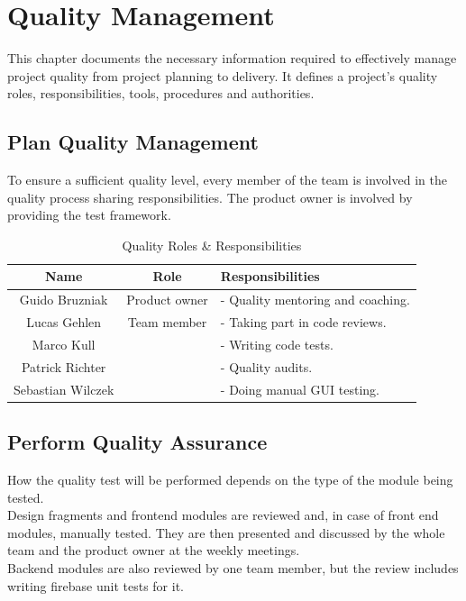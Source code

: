 \section{Quality Management}
This chapter documents the necessary information required to effectively manage project quality from project planning to delivery. It defines a project’s quality roles, responsibilities, tools, procedures and authorities.
\label{sec:quality}
\subsection{Plan Quality Management}
To ensure a sufficient quality level, every member of the team is involved in the quality process sharing responsibilities. The product owner is involved by providing the test framework.
\begin{table}[H]
\centering
\begin{tabular}{|c|c|l|}
\hline
\cellcolor{gray}Name & 
\cellcolor{gray}Role &
\cellcolor{gray}Responsibilities \\\hline
Guido Bruzniak & Product owner &
- Quality mentoring and coaching.\\\hline
Lucas Gehlen&Team member&- Taking part in code reviews.\\
Marco Kull&&- Writing code tests.\\
Patrick Richter&&- Quality audits.\\
Sebastian Wilczek&&- Doing manual GUI testing.\\\hline
\end{tabular}
\caption{Quality Roles \& Responsibilities}
\end{table}
\subsection{Perform Quality Assurance}
How the quality test will be performed depends on the type of the module being tested.\\
Design fragments and frontend modules are reviewed and, in case of front end modules, manually tested. They are then presented and discussed by the whole team and the product owner at the weekly meetings.\\
Backend modules are also reviewed by one team member, but the review includes writing firebase unit tests for it.\\

